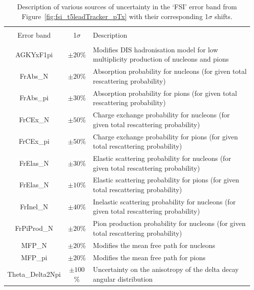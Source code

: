 \begin{table}[b!]
    \centering
    \small
    \begin{tabularx}{1.0\textwidth}{c c L}
    \hline \\ [-1.5 ex]
    Error band & 1$\sigma$ & Description\\ [0.5ex] %
    \hline
    \hline \\ [-2ex]
    AGKYxF1pi & $\pm20$\% & Modifies DIS hadronisation model for low multiplicity production of nucleons and pions \\
    FrAbs\_N & $\pm20$\% & Absorption probability for nucleons (for given total rescattering probability) \\
    FrAbs\_pi & $\pm30$\% & Absorption probability for pions (for given total rescattering probability) \\
    FrCEx\_N & $\pm50$\% & Charge exchange probability for nucleons (for given total rescattering probability)\\
    FrCEx\_pi & $\pm50$\% & Charge exchange probability for pions (for given total rescattering probability)\\
    FrElas\_N & $\pm30$\% & Elastic scattering probability for nucleons (for given total rescattering probability) \\
    FrElas\_N & $\pm10$\% & Elastic scattering probability for pions (for given total rescattering probability) \\
    FrInel\_N & $\pm40$\% & Inelastic scattering probability for nucleons (for given total rescattering probability) \\
    FrPiProd\_N & $\pm20$\% & Pion production probability for nucleons (for given total rescattering probability)\\
    MFP\_N &$\pm20$\%  & Modifies the mean free path for nucleons \\
    MFP\_pi & $\pm20$\% & Modifies the mean free path for pions \\
    Theta\_Delta2Npi & $\pm100$\% & Uncertainty on the anisotropy of the delta decay angular distribution \\
    \hline
    \end{tabularx}
    \caption{Description of various sources of uncertainty in the `FSI' error band from Figure~\ref{fig:fsi_t5leadTracker_pTx} with their corresponding 1$\sigma$ shifts.}
    \label{table:FSIUnc}
\end{table}

